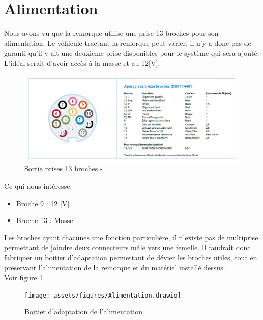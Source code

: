 \section{Alimentation}
Nous avons vu que la remorque utilise une prise 13 broches pour son alimentation. Le véhicule tractant la remorque peut varier, il n'y a donc pas de
garanti qu'il y ait une deuxième prise disponibles pour le système qui sera ajouté. L'idéal serait d'avoir accès à la masse et au 12[V].
\begin{figure}[H]
    \centering
    \includegraphics[width=14cm]{assets/figures/broches.jpg}
    \caption{Sortie prises 13 broches - \cite{prise}}
\end{figure}
Ce qui nous intéresse:
\begin{itemize}
    \item Broche 9  : 12 [V]
    \item Broche 13 : Masse
\end{itemize}
Les broches ayant chacunes une fonction particulière, il n'existe pas de multiprise permettant de joindre deux connecteurs mâle vers une femelle.
Il faudrait donc fabriquer un boitier d'adaptation permettant de dévier les broches utiles, tout en préservant l'alimentation de la remorque et du matériel installé dessus.\\
Voir figure \ref{alim}.
\begin{figure}[h]
    \centering
    \texttt{[image: assets/figures/Alimentation.drawio]}
    \caption{Boitier d'adaptation de l'alimentation \label{alim}}
\end{figure}
\newpage

